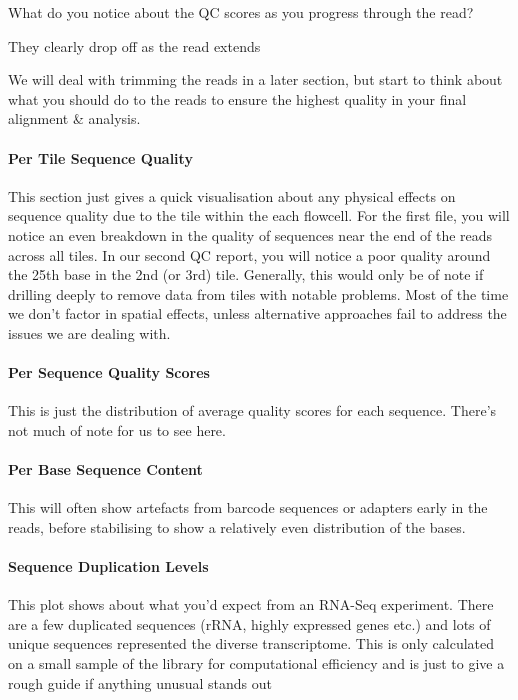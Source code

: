 \begin{questions}
What do you notice about the QC scores as you progress through the read? \\
\begin{answer}
They clearly drop off as the read extends\\
\end{answer} 
\end{questions}

We will deal with trimming the reads in a later section, but start to think about what you should do to the reads to ensure the highest quality in your final alignment \& analysis.

\paragraph{Per Tile Sequence Quality}
This section just gives a quick visualisation about any physical effects on sequence quality due to the tile within the each flowcell.
For the first file, you will notice an even breakdown in the quality of sequences near the end of the reads across all tiles.
In our second QC report, you will notice a poor quality around the 25th base in the 2nd (or 3rd) tile.
Generally, this would only be of note if drilling deeply to remove data from tiles with notable problems.
Most of the time we don't factor in spatial effects, unless alternative approaches fail to address the issues we are dealing with.

\paragraph*{Per Sequence Quality Scores}
This is just the distribution of average quality scores for each sequence.
There's not much of note for us to see here.

\paragraph{Per Base Sequence Content}
This will often show artefacts from barcode sequences or adapters early in the reads, before stabilising to show a relatively even distribution of the bases.

\paragraph{Sequence Duplication Levels}
This plot shows about what you'd expect from an RNA-Seq experiment.
There are a few duplicated sequences (rRNA, highly expressed genes etc.) and lots of unique sequences represented the diverse transcriptome.
This is only calculated on a small sample of the library for computational efficiency and is just to give a rough guide if anything unusual stands out

